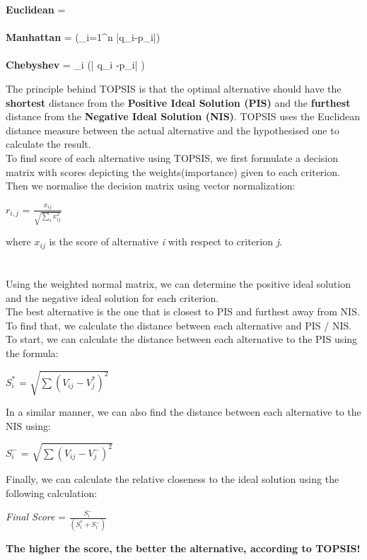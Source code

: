 \documentclass[10pt, a4paper]{article}
\begin{document}
\begin{center}

\textbf{Euclidean} =  \\~\\
\textbf{Manhattan} = (\sum_{i=1}^n |q_i-p_i|)
\\~\\
\textbf{Chebyshev} = \max_{i} (| q_{i} -p_{i}| )

\end{center}
The principle behind TOPSIS is that the optimal alternative should have the \textbf{shortest} distance from the \textbf{Positive Ideal Solution (PIS)} and the \textbf{furthest} distance from the \textbf{Negative Ideal Solution (NIS)}.
TOPSIS uses the Euclidean distance measure between the actual alternative and the hypothesised one to calculate the result.
\\
To find score of each alternative using TOPSIS, we first formulate a decision matrix with scores depicting the weights(importance) given to each criterion.\\
Then we normalise the decision matrix using vector normalization:
\begin{center}
    
\LARGE{$r_{i,j}$ = $\frac{x_{ij}}{\sqrt{\sum_ix_{ij}^2}}$}\\
\end{center}
where \emph{$x_{ij}$} is the score of alternative \emph{i} with respect to criterion \emph{j}.\\~\\~\\
Using the weighted normal matrix, we can determine the positive ideal solution and the negative ideal solution for each criterion.\\
The best alternative is the one that is closest to PIS and furthest away from NIS. To find that, we calculate the distance between each alternative and PIS / NIS.\\
To start, we can calculate the distance between each alternative to the PIS using the formula: 
\begin{center}
    
\large{$S_i^*$ = $\sqrt{\sum(V_{ij} - V_{j}^*)^2}$} 
\end{center}
In a similar manner, we can also find the distance between each alternative to the NIS using:
\begin{center}
    
\large{$S_i^-$ = $\sqrt{\sum(V_{ij} - V_{j}^-)^2}$} 
\end{center}
Finally, we can calculate the relative closeness to the ideal solution using the following calculation:
\begin{center}
    
\large{\emph{Final Score}} = \LARGE{$\frac{S_i^-}{(S_i^* + S_i^-)}$}
\end{center}
\textbf{The higher the score, the better the alternative, according to TOPSIS!}
\\
\end{document}
